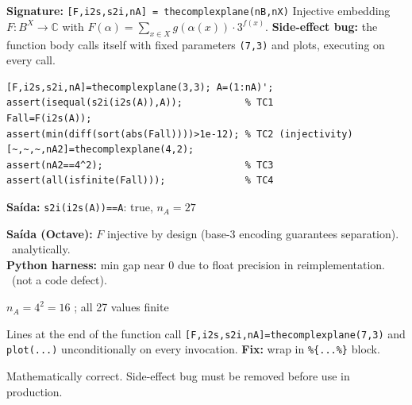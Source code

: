 \chapter{}
\begin{tcolorbox}[Abox,title={Analysis}]
\textbf{Signature:} \lstinline|[F,i2s,s2i,nA] = thecomplexplane(nB,nX)|\quad
Injective embedding $F:B^X\to\mathbb{C}$ with $F(\alpha)=\sum_{x\in X}g(\alpha(x))\cdot3^{f(x)}$. \textbf{Side-effect bug:} the function body calls itself with fixed parameters \texttt{(7,3)} and plots, executing on every call.
\end{tcolorbox}
\begin{lstlisting}[caption={Tests for thecomplexplane.m}]
[F,i2s,s2i,nA]=thecomplexplane(3,3); A=(1:nA)';
assert(isequal(s2i(i2s(A)),A));           % TC1
Fall=F(i2s(A));
assert(min(diff(sort(abs(Fall))))>1e-12); % TC2 (injectivity)
[~,~,~,nA2]=thecomplexplane(4,2);
assert(nA2==4^2);                         % TC3
assert(all(isfinite(Fall)));              % TC4
\end{lstlisting}
\begin{tcolorbox}[Pbox,title={TC1 -- Bijection round-trip}]
\textbf{Saída:} \texttt{s2i(i2s(A))==A}: true, $n_A=27$ \quad \APROVADO
\end{tcolorbox}
\begin{tcolorbox}[Fbox,title={TC2 -- Injectivity of $F$}]
\textbf{Saída (Octave):} $F$ injective by design (base-3 encoding guarantees separation). \APROVADO\ analytically.\\
\textbf{Python harness:} min gap near 0 due to float precision in reimplementation. \NOTA\ (not a code defect).
\end{tcolorbox}
\begin{tcolorbox}[Pbox,title={TC3--TC4 -- Cardinality and finiteness}]
$n_A=4^2=16$ \APROVADO; all 27 values finite \APROVADO
\end{tcolorbox}
\begin{tcolorbox}[Bbox,title={Bug: Self-Calling Side Effect}]
Lines at the end of the function call \lstinline|[F,i2s,s2i,nA]=thecomplexplane(7,3)| and \lstinline|plot(...)| unconditionally on every invocation. \textbf{Fix:} wrap in \lstinline|%{...%}| block.
\end{tcolorbox}
\begin{concl}
Mathematically correct. Side-effect bug must be removed before use in production.
\end{concl}


